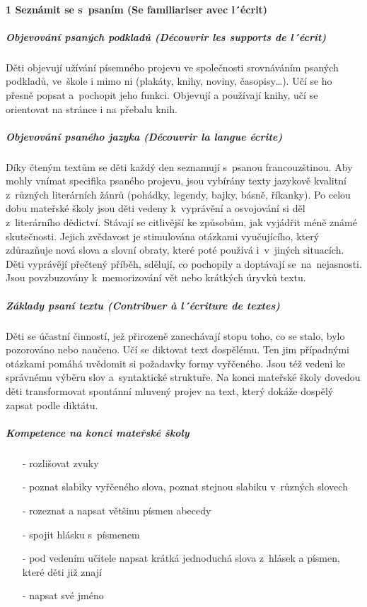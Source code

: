 			\paragraph*{1 Seznámit se s psaním (Se familiariser avec l´écrit)}
				\subparagraph{Objevování psaných podkladů (Découvrir les supports de l´écrit)}
					Děti objevují užívání písemného projevu ve společnosti srovnáváním psaných podkladů, ve škole i mimo ni (plakáty, knihy, noviny, časopisy…). Učí se ho přesně popsat a pochopit jeho funkci. Objevují a používají knihy, učí se orientovat na stránce i na přebalu knih. 
				\subparagraph{Objevování psaného jazyka (Découvrir la langue écrite)}
					Díky čteným textům se děti každý den seznamují s psanou francouzštinou. Aby mohly vnímat specifika psaného projevu, jsou vybírány texty jazykově kvalitní z různých literárních žánrů (pohádky, legendy, bajky, básně, říkanky). Po celou dobu mateřské školy jsou děti vedeny k vyprávění a osvojování si děl z literárního dědictví. Stávají se citlivější ke způsobům, jak vyjádřit méně známé skutečnosti. Jejich zvědavost je stimulována otázkami vyučujícího, který zdůrazňuje nová slova a slovní obraty, které poté používá i v jiných situacích.  Děti vyprávějí přečtený příběh, sdělují, co pochopily a doptávají se na nejasnosti. Jsou povzbuzovány k memorizování vět nebo krátkých úryvků textu. 
				\subparagraph{Základy psaní textu (Contribuer à l´écriture de textes)}
					Děti se účastní činností, jež přirozeně zanechávají stopu toho, co se stalo, bylo pozorováno nebo naučeno. Učí se diktovat text dospělému. Ten jim případnými otázkami pomáhá uvědomit si požadavky formy vyřčeného. Jsou též vedeni ke správnému výběru slov a syntaktické struktuře. Na konci mateřské školy dovedou děti transformovat spontánní mluvený projev na text, který dokáže dospělý zapsat podle diktátu.
				\subparagraph{Kompetence na konci mateřské školy \hspace{3cm}}

				\begin{itemize}
					\setlength\itemsep{-2mm}
					\item[-] rozlišovat zvuky
					\item[-] poznat slabiky vyřčeného slova, poznat stejnou slabiku v různých slovech
					\item[-] rozeznat a napsat většinu písmen abecedy
					\item[-] spojit hlásku s písmenem
					\item[-] pod vedením učitele napsat krátká jednoduchá slova z hlásek a písmen, které děti již znají 	
					\item[-] napsat své jméno
				\end{itemize}


